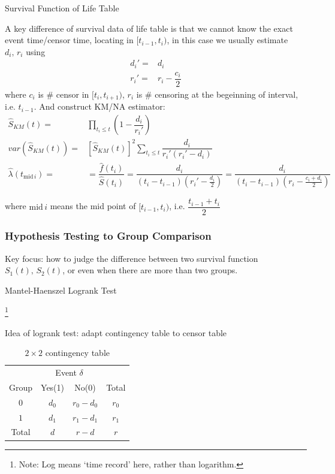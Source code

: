 \begin{point}
    Survival Function of Life Table
\end{point}

A key difference of survival data of life table is that we cannot know the exact event time/censor time, locating in $ [t_{i-1},t_i) $, in this case we usually estimate $ d_i,\,r_i $ using
\begin{align}
    d_i'=&d_i\\
    r_i'=&r_i-\dfrac{c_i}{2}
\end{align}
where $ c_i $ is \# censor in $ [t_i,t_{i+1}) $, $ r_i $ is \# censoring at the begeinning of interval, i.e. $ t_{i-1} $. And construct KM/NA estimator:
\begin{align}
    \hat{S}_{KM}(t)=&\prod_{t_i\leq t}\left( 1-\dfrac{d_i}{r_i'} \right)\\
    var(\hat{S}_{KM}(t))=&\left[\hat{S}_{KM}(t)\right]^2\sum_{t_i\leq t}\dfrac{d_i}{r_i'(r_i'-d_i)}\\
    \hat{\lambda }(t_{\mathrm{mid\,}i })=&=\dfrac{\hat{f}(t_i)}{\hat{S}(t_i)}= \dfrac{d_i}{(t_{i}-t_{i-1})(r_i'-\frac{d_i}{2})}=\dfrac{d_i}{(t_{i}-t_{i-1})(r_i-\frac{c_i+d_i}{2})}
\end{align}

    where $ \mathrm{mid}\,i  $ means the mid point of $ [t_{i-1},t_{i}) $, i.e. $ \dfrac{t_{i-1}+t_{i}}{2} $


\subsubsection{Hypothesis Testing to Group Comparison}\label{SubSubSectionSurvivalAnalysisGroupComparison}
Key focus: how to judge the difference between two survival function $ S_1(t),\,S_2(t) $, or even when there are more than two groups.

\begin{point}
    Mantel-Haenszel Logrank Test
\end{point}\footnote{Note: Log means `time record' here, rather than logarithm.}

Idea of logrank test: adapt contingency table to censor table
\begin{table}[H]
    \centering
    \renewcommand\arraystretch{1}
    \caption{$ 2\times 2 $ contingency table}
    \begin{tabular}{cccc}
        \hline
        \hline
        &\multicolumn{2}{c}{Event $ \delta  $}&\\
        \cline{2-3}
        Group&Yes(1)&No(0)&Total\\
        \hline
        $ 0 $&$ d_0 $&$ r_0-d_0 $&$ r_0 $\\
        $ 1 $&$ d_1 $&$ r_1-d_1 $&$ r_1 $\\
        \hline
        Total&$ d $&$ r-d $&$ r $\\
        \hline
        \hline
    \end{tabular}
    \label{}
\end{table}

